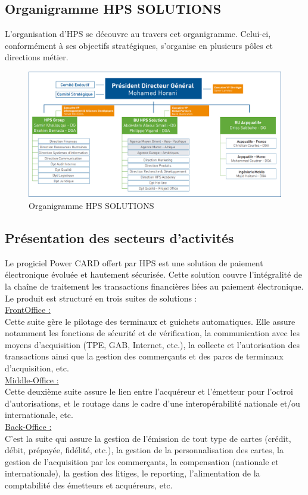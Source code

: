 \subsection{Organigramme HPS SOLUTIONS}
L’organisation d’HPS se découvre au travers cet organigramme. Celui-ci, conformément à ses objectifs stratégiques, s’organise en plusieurs pôles et directions métier.
\begin{figure}[h!]  
  \centering
    \includegraphics[width=1.1\textwidth]{chapitre1/Figures/organigrameHpsSolution.png}
  \caption{Organigramme HPS SOLUTIONS}
\end{figure}
\subsection{Présentation des secteurs d’activités}
Le progiciel Power CARD offert par HPS est une solution de paiement électronique évoluée et hautement sécurisée. Cette solution couvre l’intégralité de la chaîne de traitement les transactions financières liées au paiement électronique. Le produit est structuré en trois suites de solutions :\\
\ul{FrontOffice :}\\
Cette suite gère le pilotage des terminaux et guichets automatiques. Elle assure notamment les fonctions de sécurité et de vérification, la communication avec les moyens d’acquisition (TPE, GAB, Internet, etc.), la collecte et l’autorisation des transactions ainsi que la gestion des commerçants et des parcs de terminaux d’acquisition, etc.\\
\underline{Middle-Office :}\\
Cette deuxième suite assure le lien entre l’acquéreur et l’émetteur pour l’octroi d’autorisations, et le routage dans le cadre d’une interopérabilité nationale et/ou internationale, etc.\\
\underline{Back-Office :}\\
C’est la suite qui assure la gestion de l’émission de tout type de cartes (crédit, débit, prépayée, fidélité, etc.), la gestion de la personnalisation des cartes, la gestion de l’acquisition par les commerçants, la compensation (nationale et internationale), la gestion des litiges, le reporting, l’alimentation de la comptabilité des émetteurs et acquéreurs, etc.
